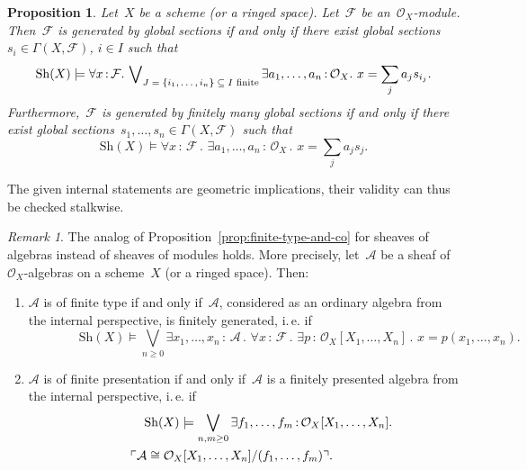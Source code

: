 \documentclass[10pt,reqno,a4paper]{amsbook}
\makeatletter
\theoremstyle{definition}
\theoremstyle{plain}
\newtheorem{prop}[defn]{Proposition}
\theoremstyle{remark}
\newtheorem{rem}[defn]{Remark}
\newcommand{\A}{\mathcal{A}}
\newcommand{\F}{\mathcal{F}}
\renewcommand{\O}{\mathcal{O}}
\newcommand{\Sh}{\mathrm{Sh}}
\newcommand{\?}{\,{:}\,}
\renewcommand{\_}{\mathpunct{.}\,}
\newcommand{\speak}[1]{\ulcorner\text{\textnormal{#1}}\urcorner}
\newcommand{\ie}{i.\,e.\@\xspace}
\renewenvironment{proof}[1][\proofname]{\par
  \pushQED{\qed}%
  \normalfont \topsep6\p@\@plus6\p@\relax
  \trivlist
  \item[\hskip\labelsep
        \itshape
    #1\@addpunct{.}]\ignorespaces
}{%
  \popQED\endtrivlist\@endpefalse
}
\makeatother
\begin{document}
\begin{prop}Let~$X$ be a scheme (or a ringed space). Let~$\F$ be
an~$\O_X$-module. Then~$\F$ is generated by global sections if and only if
there exist global sections~$s_i \in \Gamma(X,\F)$, $i \in I$ such that
\[ \Sh(X) \models \forall x\?\F\_ \bigvee\nolimits_{\textnormal{$J=\{i_1,\ldots,i_n\} \subseteq I$ finite}}
  \exists a_1,\ldots,a_n\?\O_X\_
  x = \sum_j a_j s_{i_j}. \]
Furthermore,~$\F$ is generated by finitely many global sections if and only if
there exist global sections~$s_1,\ldots,s_n \in \Gamma(X,\F)$ such that
\[ \Sh(X) \models \forall x\?\F\_ \exists a_1,\ldots,a_n\?\O_X\_ x = \sum_j a_j
s_j. \]
\end{prop}
\begin{proof}The given internal statements are geometric implications, their
validity can thus be checked stalkwise.\end{proof}

\begin{rem}The analog of Proposition~\ref{prop:finite-type-and-co} for
sheaves of algebras instead of sheaves of modules holds. More precisely,
let~$\A$ be a sheaf of~$\O_X$-algebras on a scheme~$X$ (or a ringed space).
Then:
\begin{enumerate}
\item $\A$ is of finite type if and only if~$\A$, considered as an ordinary
algebra from the internal perspective, is finitely generated, \ie if
\[ {\qquad\qquad} \Sh(X) \models
  \bigvee_{n \geq 0}
  \exists x_1,\ldots,x_n\?\A\_
  \forall x\?\F\_
  \exists p\?\O_X[X_1,\ldots,X_n]\_
  x = p(x_1,\ldots,x_n). \]
\item $\A$ is of finite presentation if and only if~$\A$ is a finitely
presented algebra from the internal perspective, \ie if
\begin{multline*}
  {\qquad\qquad} \Sh(X) \models \bigvee_{n,m \geq 0}
  \exists f_1,\ldots,f_m \? \O_X[X_1,\ldots,X_n]\_ \\
  \speak{$\A \cong \O_X[X_1,\ldots,X_n]/(f_1,\ldots,f_m)$}. \qquad
\end{multline*}
\end{enumerate}
\end{rem}
\end{document}
